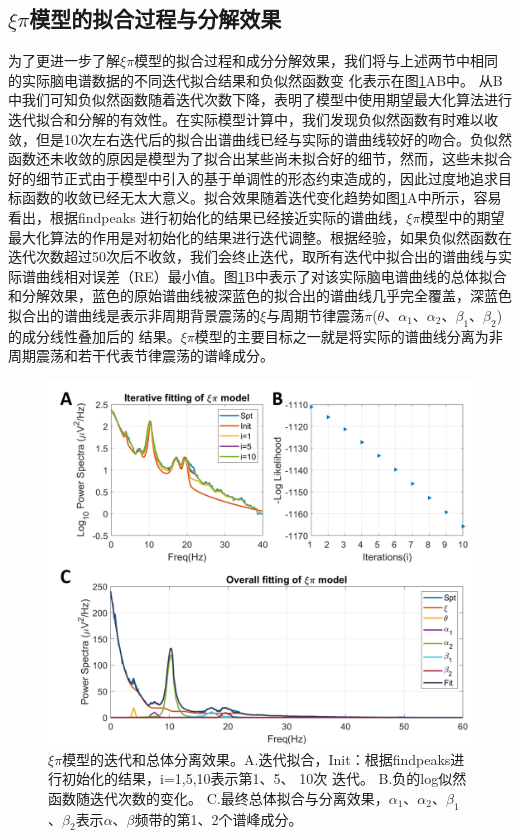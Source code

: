 \subsection{$\xi\pi$模型的拟合过程与分解效果}
为了更进一步了解$\xi\pi$模型的拟合过程和成分分解效果，我们将与上述两节中相同的实际脑电谱数据的不同迭代拟合结果和负似然函数变
化表示在图\ref{allinone}AB中。 从B中我们可知负似然函数随着迭代次数下降，表明了模型中使用期望最大化算法进行迭代拟合和分解的有效性。在实际模型计算中，我们发现负似然函数有时难以收敛，但是10次左右迭代后的拟合出谱曲线已经与实际的谱曲线较好的吻合。负似然函数还未收敛的原因是模型为了拟合出某些尚未拟合好的细节，然而，这些未拟合好的细节正式由于模型中引入的基于单调性的形态约束造成的，因此过度地追求目标函数的收敛已经无太大意义。拟合效果随着迭代变化趋势如图\ref{allinone}A中所示，容易看出，根据findpeaks
进行初始化的结果已经接近实际的谱曲线，$\xi\pi$模型中的期望最大化算法的作用是对初始化的结果进行迭代调整。根据经验，如果负似然函数在迭代次数超过50次后不收敛，我们会终止迭代，取所有迭代中拟合出的谱曲线与实际谱曲线相对误差（RE）最小值。图\ref{allinone}B中表示了对该实际脑电谱曲线的总体拟合和分解效果，蓝色的原始谱曲线被深蓝色的拟合出的谱曲线几乎完全覆盖，深蓝色拟合出的谱曲线是表示非周期背景震荡的$\xi$与周期节律震荡$\pi$($\theta$、$\alpha_1$、$\alpha_2$、$\beta_1$、$\beta_2$)的成分线性叠加后的
结果。$\xi\pi$模型的主要目标之一就是将实际的谱曲线分离为非周期震荡和若干代表节律震荡的谱峰成分。
\begin{figure}
	\includegraphics[width=15cm]{pic/xipi/allinone.png}
	\caption{$\xi\pi$模型的迭代和总体分离效果。A.迭代拟合，Init：根据findpeaks进行初始化的结果，i=1,5,10表示第1、5、
	10次	迭代。 B.负的log似然函数随迭代次数的变化。 C.最终总体拟合与分离效果，$\alpha_1$、$\alpha_2$、$\beta_1$、$\beta_2$表示$\alpha$、$\beta$频带的第1、2个谱峰成分。}
	\label{allinone}
\end{figure}

